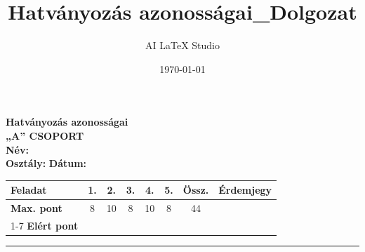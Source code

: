 \documentclass[a4paper,11pt]{article}
\title{Hatványozás azonosságai_Dolgozat}
\author{AI LaTeX Studio}
\date{\today}
\begin{document}

\noindent
\begin{minipage}[t]{0.45\textwidth}
  \vspace{0pt}
  
  {\Large\textbf{Hatványozás azonosságai}}\\[2mm]
  {\large\textbf{„A” CSOPORT}}\\[2mm]
  \textbf{Név:} \underline{\hspace{4.5cm}}\\[2mm]
  \textbf{Osztály:} \underline{\hspace{1.5cm}} \quad \textbf{Dátum:} \underline{\hspace{2cm}}
\end{minipage}
\hfill
\begin{minipage}[t]{0.53\textwidth}
  \vspace{0pt}
  \begin{flushright}
  {\small
  \begin{tabular}{|l|c|c|c|c|c||c||c|}
    \hline
    \textbf{Feladat} & 1. & 2. & 3. & 4. & 5. & \textbf{Össz.} & \textbf{Érdemjegy} \\ \hline
    \textbf{Max. pont} & 8 & 10 & 8 & 10 & 8 & 44 & \\ \cline{1-7}
    \textbf{Elért pont} &  &  &  &  &  &  & & \\ \hline
  \end{tabular}
  }
  \end{flushright}
\end{minipage}
\vspace{2mm}
\hrule
\vspace{4mm}
\end{document}
